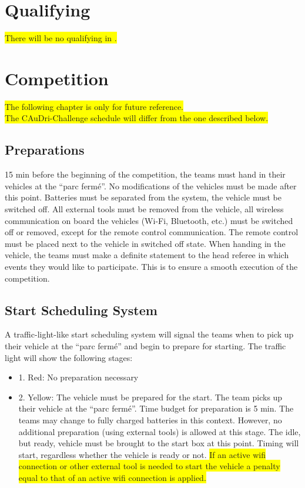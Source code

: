 \documentclass[a4paper]{report}
\begin{document}
{{{\section{Qualifying}

\colorbox{yellow}{There will be no qualifying in \the\year{}.} 

\section{Competition} 

\colorbox{yellow}{The following chapter is only for future reference.}\\ 
\colorbox{yellow}{The \the\year{} CAuDri-Challenge schedule will differ from the one described below.}

\subsection{Preparations} 

15 min before the beginning of the competition, the teams must hand in their vehicles at the “parc fermé”. No modifications of the vehicles must be made after this point. Batteries must be separated from the system, the vehicle must be switched off. All external tools must be removed from the vehicle, all wireless communication on board the vehicles (Wi-Fi, Bluetooth, etc.) must be switched off or removed, except for the remote control communication. The remote control must be placed next to the vehicle in switched off state. When handing in the vehicle, the teams must make a definite statement to the head referee in which events they would like to participate. This is to ensure a smooth execution of the competition. 

\subsection{Start Scheduling System}
\label{start_scheduling}

A traffic-light-like start scheduling system will signal the teams when to pick up their vehicle at the “parc fermé” and begin to prepare for starting. The traffic light will show the following stages: 

\begin{itemize}
\item 1. Red: No preparation necessary 

\item 2. Yellow: The vehicle must be prepared for the start. The team picks up their vehicle at the “parc fermé”. Time budget for preparation is 5 min. The teams may change to fully charged batteries in this context. However, no additional preparation (using external tools) is allowed at this stage. The idle, but ready, vehicle must be brought to the start box at this point. Timing will start, regardless whether the vehicle is ready or not. \colorbox{yellow}{If an active wifi connection or other external tool is needed to start the vehicle a penalty equal to that of an active wifi connection is applied.}


\end{itemize}}}}
\end{document}

